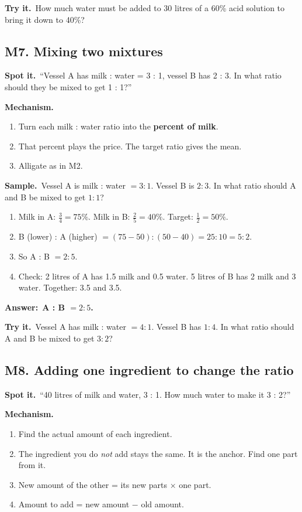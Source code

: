 \documentclass[11pt,a4paper]{article}
\let\oldsubsection\subsection
\renewcommand{\subsection}{\needspace{9\baselineskip}\oldsubsection}
\newcommand{\spot}{\textbf{\color{ember}Spot it.}\ }
\newcommand{\mech}{\textbf{\color{ember}Mechanism.}\ }
\newif\ifkeepsamp
\newcommand{\ans}[1]{\par\nopagebreak\noindent\textbf{\color{ember}Answer:}\ \textbf{#1}\par}
\newcommand{\samp}{\ifkeepsamp\needspace{4\baselineskip}\fi\textbf{\color{ember}Sample.}\ }
\newcommand{\tryit}[1]{\textbf{\color{ember}Try it.}\ #1}
\begin{document}
\tryit How much water must be added to 30 litres of a 60\% acid solution to bring it down to 40\%?

\subsection{M7. Mixing two mixtures}
\spot ``Vessel A has milk : water = 3 : 1, vessel B has 2 : 3. In what ratio should they be mixed to get 1 : 1?''

\mech
\begin{enumerate}
\item Turn each milk : water ratio into the \textbf{percent of milk}.
\item That percent plays the price. The target ratio gives the mean.
\item Alligate as in M2.
\end{enumerate}

\samp Vessel A is milk : water $= 3 : 1$. Vessel B is $2 : 3$. In what ratio should A and B be mixed to get $1 : 1$?
\begin{enumerate}
\item Milk in A: $\tfrac34 = 75\%$. Milk in B: $\tfrac25 = 40\%$. Target: $\tfrac12 = 50\%$.
\item B (lower) : A (higher) $= (75 - 50) : (50 - 40) = 25 : 10 = 5 : 2$.
\item So A : B $= 2 : 5$.
\item Check: 2 litres of A has 1.5 milk and 0.5 water. 5 litres of B has 2 milk and 3 water. Together: 3.5 and 3.5.
\end{enumerate}
\ans{A : B $= 2 : 5$.}

\tryit Vessel A has milk : water $= 4 : 1$. Vessel B has $1 : 4$. In what ratio should A and B be mixed to get $3 : 2$?

\subsection{M8. Adding one ingredient to change the ratio}
\spot ``40 litres of milk and water, 3 : 1. How much water to make it 3 : 2?''

\mech
\begin{enumerate}
\item Find the actual amount of each ingredient.
\item The ingredient you do \emph{not} add stays the same. It is the anchor. Find one part from it.
\item New amount of the other = its new parts $\times$ one part.
\item Amount to add = new amount $-$ old amount.
\end{enumerate}
\end{document}
